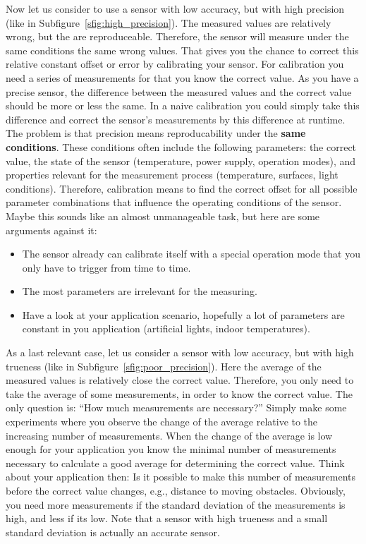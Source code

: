 Now let us consider to use a sensor with low accuracy, but with high precision (like in Subfigure~\ref{sfig:high_precision}). The measured values are relatively wrong, but the are reproduceable. Therefore, the sensor will measure under the same conditions the same wrong values. That gives you the chance to correct this relative constant offset or error by calibrating your sensor. For calibration you need a series of measurements for that you know the correct value. As you have a precise sensor, the difference between the measured values and the correct value should be more or less the same. In a naive calibration you could simply take this difference and correct the sensor's measurements by this difference at runtime. The problem is that precision means reproducability under the \textbf{same conditions}. These conditions often include the following parameters: the correct value, the state of the sensor (temperature, power supply, operation modes), and properties relevant for the measurement process (temperature, surfaces, light conditions). Therefore, calibration means to find the correct offset for all possible parameter combinations that influence the operating conditions of the sensor. Maybe this sounds like an almost unmanageable task, but here are some arguments against it:

\begin{itemize}
 \item The sensor already can calibrate itself with a special operation mode that you only have to trigger from time to time.
 \item The most parameters are irrelevant for the measuring.
 \item Have a look at your application scenario, hopefully a lot of parameters are constant in you application (artificial lights, indoor temperatures).
\end{itemize}

As a last relevant case, let us consider a sensor with low accuracy, but with high trueness (like in Subfigure~\ref{sfig:poor_precision}). Here the average of the measured values is relatively close the correct value. Therefore, you only need to take the average of some measurements, in order to know the correct value. The only question is: ``How much measurements are necessary?'' Simply make some experiments where you observe the change of the average relative to the increasing number of measurements. When the change of the average is low enough for your application you know the minimal number of measurements necessary to calculate a good average for determining the correct value. Think about your application then: Is it possible to make this number of measurements before the correct value changes, e.g., distance to moving obstacles. Obviously, you need more measurements if the standard deviation of the measurements is high, and less if its low. Note that a sensor with high trueness and a small standard deviation is actually an accurate sensor.

